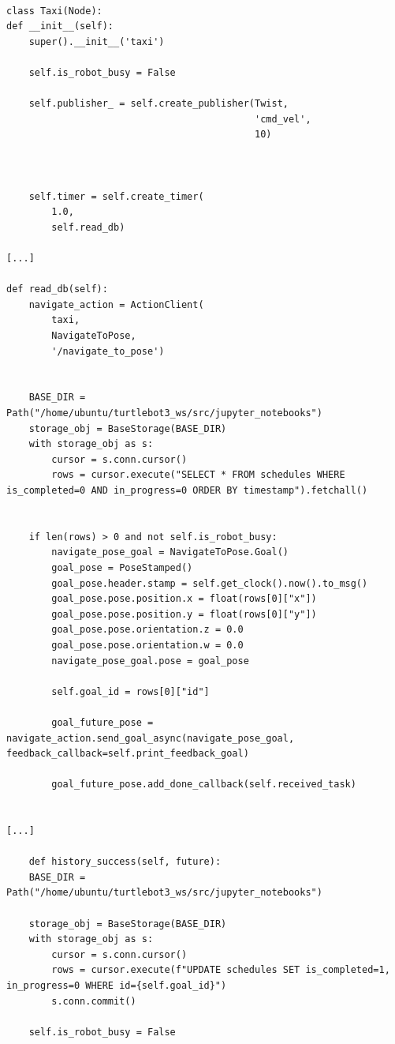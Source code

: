 \documentclass[12pt]{article}
\begin{document}
\begin{lstlisting}

class Taxi(Node):
def __init__(self): 
    super().__init__('taxi')

    self.is_robot_busy = False
    
    self.publisher_ = self.create_publisher(Twist, 
                                            'cmd_vel',
                                            10)
    


    self.timer = self.create_timer(
        1.0,
        self.read_db)

[...]

def read_db(self):
    navigate_action = ActionClient(
        taxi, 
        NavigateToPose,
        '/navigate_to_pose')


    BASE_DIR = Path("/home/ubuntu/turtlebot3_ws/src/jupyter_notebooks")
    storage_obj = BaseStorage(BASE_DIR)
    with storage_obj as s:
        cursor = s.conn.cursor()
        rows = cursor.execute("SELECT * FROM schedules WHERE is_completed=0 AND in_progress=0 ORDER BY timestamp").fetchall()


    if len(rows) > 0 and not self.is_robot_busy:
        navigate_pose_goal = NavigateToPose.Goal()    
        goal_pose = PoseStamped()
        goal_pose.header.stamp = self.get_clock().now().to_msg()
        goal_pose.pose.position.x = float(rows[0]["x"])
        goal_pose.pose.position.y = float(rows[0]["y"])
        goal_pose.pose.orientation.z = 0.0
        goal_pose.pose.orientation.w = 0.0
        navigate_pose_goal.pose = goal_pose

        self.goal_id = rows[0]["id"]

        goal_future_pose = navigate_action.send_goal_async(navigate_pose_goal, feedback_callback=self.print_feedback_goal)

        goal_future_pose.add_done_callback(self.received_task)


[...]

    def history_success(self, future):
    BASE_DIR = Path("/home/ubuntu/turtlebot3_ws/src/jupyter_notebooks")

    storage_obj = BaseStorage(BASE_DIR)
    with storage_obj as s:
        cursor = s.conn.cursor()
        rows = cursor.execute(f"UPDATE schedules SET is_completed=1, in_progress=0 WHERE id={self.goal_id}")
        s.conn.commit()

    self.is_robot_busy = False
    
\end{lstlisting}
\end{document}
